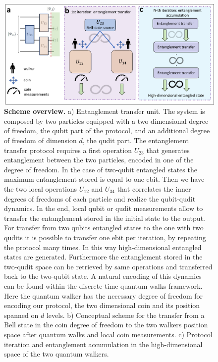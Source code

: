 \documentclass[
	aps, pra,
	superscriptaddress, twocolumn,
	floatfix,
	10pt
]{revtex4-1}
\begin{document}
\begin{figure}[ht]
    \centering
    \includegraphics[scale=0.45]{new_concept.pdf}
    \caption{\textbf{Scheme overview.}
        a) Entanglement transfer unit. The system is composed by two particles equipped with  a two dimensional degree of freedom, the qubit part of the protocol, and an additional degree of freedom of dimension $d$, the qudit part. The entanglement transfer protocol requires a first operation $U_{23}$ that generates entanglement between the two particles, encoded in one of the degree of freedom. In the case of two-qubit entangled states the maximum entanglement stored is equal to one ebit. Then we have the two local operations $U_{12}$ and $U_{34}$ that correlates the inner degrees of freedoms of each particle and realize the qubit-qudit dynamics. In the end, local qubit or qudit measurements allow to transfer the entanglement stored in the initial state to the output. For transfer from two qubits entangled states to the one with two qudits it is possible to transfer one ebit per iteration, by repeating the protocol many times. In this way high-dimensional entangled states are generated. Furthermore the entanglement stored in the two-qudit space can be retrieved by same operations and transferred back to the two-qubit state. A natural encoding of this dynamics can be found within the discrete-time quantum walks framework. Here the quantum walker has the necessary degree of freedom for encoding our protocol, the two dimensional coin and its position spanned on $d$ levels. b) Conceptual scheme for the transfer from a Bell state in the coin degree of freedom to the two walkers position space after quantum walks and local coin measurements. c) Protocol iteration and entanglement accumulation in the high-dimensional space of the two quantum walkers.}
    \label{fig:conceptual_scheme}
\end{figure}
\end{document}
